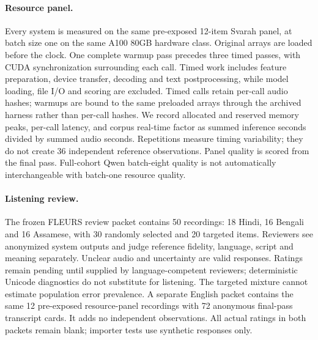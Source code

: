 \documentclass[11pt]{article}
\begin{document}
\paragraph{Resource panel.} Every system is measured on the same pre-exposed 12-item Svarah panel, at batch size one on the same A100 80GB hardware class. Original arrays are loaded before the clock. One complete warmup pass precedes three timed passes, with CUDA synchronization surrounding each call. Timed work includes feature preparation, device transfer, decoding and text postprocessing, while model loading, file I/O and scoring are excluded. Timed calls retain per-call audio hashes; warmups are bound to the same preloaded arrays through the archived harness rather than per-call hashes. We record allocated and reserved memory peaks, per-call latency, and corpus real-time factor as summed inference seconds divided by summed audio seconds. Repetitions measure timing variability; they do not create 36 independent reference observations. Panel quality is scored from the final pass. Full-cohort Qwen batch-eight quality is not automatically interchangeable with batch-one resource quality.

\paragraph{Listening review.} The frozen FLEURS review packet contains 50 recordings: 18 Hindi, 16 Bengali and 16 Assamese, with 30 randomly selected and 20 targeted items. Reviewers see anonymized system outputs and judge reference fidelity, language, script and meaning separately. Unclear audio and uncertainty are valid responses. Ratings remain pending until supplied by language-competent reviewers; deterministic Unicode diagnostics do not substitute for listening. The targeted mixture cannot estimate population error prevalence. A separate English packet contains the same 12 pre-exposed resource-panel recordings with 72 anonymous final-pass transcript cards. It adds no independent observations. All actual ratings in both packets remain blank; importer tests use synthetic responses only.
\end{document}
